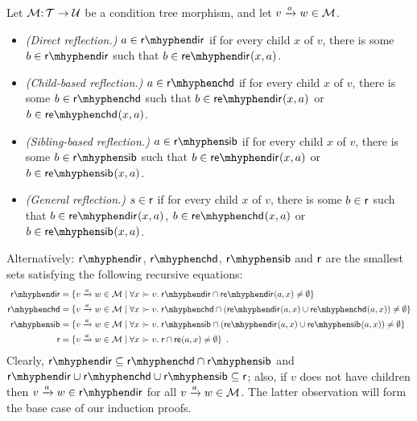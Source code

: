 \begin{definition}\label{def:syntactic reflection}
Let ${\mathcal{M}}{:}\, {\mathcal{T}}\rightarrow{\mathcal{U}}$ be a condition tree morphism, and let ${v}\xrightarrow{a}{w}\in{\mathcal{M}}$.
\begin{itemize}[topsep=\smallskipamount]
\item \emph{(Direct reflection.)} $a\in\rdir$ if for every child $x$ of $v$, there is some $b\in\rdir$ such that $\issdir b{x,a}$.
\item \emph{(Child-based reflection.)} $a\in\rchd$ if for every child $x$ of $v$, there is some $b\in\rchd$ such that $\issdir b{x,a}$ or $\isschd b{x,a}$.
\item \emph{(Sibling-based reflection.)} $a\in\rsib$ if for every child $x$ of $v$, there is some $b\in \rsib$ such that $\issdir b{x,a}$ or $\isssib b{x,a}$.
\item \emph{(General reflection.)} $s\in {\mathsf{r}}$ if for every child $x$ of $v$, there is some $b\in {\mathsf{r}}$ such that $\issdir b{x,a}$, $\isschd b{x,a}$ or $\isssib b{x,a}$.
\end{itemize}
\end{definition}
%
Alternatively: $\rdir$, $\rchd$, $\rsib$ and ${\mathsf{r}}$ are the smallest sets satisfying the following recursive equations:
\begin{align*}
\rdir ={} & \gensetof{\trip vaw\in \cM}{\forall x\childof v\st \rdir \cap \sdir{a,x}\neq\emptyset} \\
\rchd ={} &\gensetof{\trip vaw\in \cM}{\forall x\childof v\st \rchd \cap (\sdir{a,x}\cup \schd{a,x}) \neq\emptyset} \\
\rsib ={} &\gensetof{\trip vaw\in \cM}{\forall x\childof v\st \rsib \cap (\sdir{a,x}\cup \ssib{a,x}) \neq\emptyset} \\
\rgen ={} &\gensetof{\trip vaw\in \cM}{\forall x\childof v\st \rgen \cap \re{a,x} \neq\emptyset} \enspace.
\end{align*}
%
Clearly, $\rdir\subseteq \rchd\cap \rsib$ and $\rdir\cup \rchd \cup \rsib \subseteq \rgen$; also, if $v$ does not have children then $\trip vaw\in \rdir$ for all ${v}\xrightarrow{a}{w}\in{\mathcal{M}}$. The latter observation will form the base case of our induction proofs.


